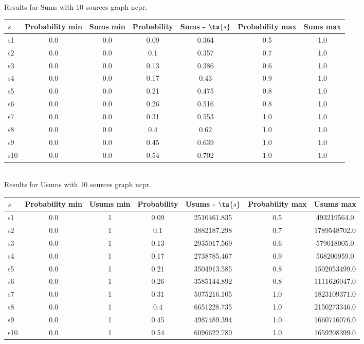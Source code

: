 \documentclass{article}
\begin{document}
\noindent Results for Sums with 10 sources graph ncpr.

\noindent\begin{tabular}{|l|c|c|c|c|c|c|}
\hline
$s$& Probability min & Sums min & Probability & Sums - $\ts{s}$ & Probability max & Sums max\\
\hline
s1 &0.0 & 0.0 & 0.09 & 0.364 & 0.5 & 1.0\\
\hline
s2 &0.0 & 0.0 & 0.1 & 0.357 & 0.7 & 1.0\\
\hline
s3 &0.0 & 0.0 & 0.13 & 0.386 & 0.6 & 1.0\\
\hline
s4 &0.0 & 0.0 & 0.17 & 0.43 & 0.9 & 1.0\\
\hline
s5 &0.0 & 0.0 & 0.21 & 0.475 & 0.8 & 1.0\\
\hline
s6 &0.0 & 0.0 & 0.26 & 0.516 & 0.8 & 1.0\\
\hline
s7 &0.0 & 0.0 & 0.31 & 0.553 & 1.0 & 1.0\\
\hline
s8 &0.0 & 0.0 & 0.4 & 0.62 & 1.0 & 1.0\\
\hline
s9 &0.0 & 0.0 & 0.45 & 0.639 & 1.0 & 1.0\\
\hline
s10 &0.0 & 0.0 & 0.54 & 0.702 & 1.0 & 1.0\\
\hline
\end{tabular}\\

\noindent Results for Usums with 10 sources graph ncpr.

\noindent\begin{tabular}{|l|c|c|c|c|c|c|}
\hline
$s$& Probability min & Usums min & Probability & Usums - $\ts{s}$ & Probability max & Usums max\\
\hline
s1 &0.0 & 1 & 0.09 & 2510461.835 & 0.5 & 493219564.0\\
\hline
s2 &0.0 & 1 & 0.1 & 3882187.298 & 0.7 & 1789548702.0\\
\hline
s3 &0.0 & 1 & 0.13 & 2935017.569 & 0.6 & 579018005.0\\
\hline
s4 &0.0 & 1 & 0.17 & 2738785.467 & 0.9 & 568206959.0\\
\hline
s5 &0.0 & 1 & 0.21 & 3504913.585 & 0.8 & 1502053499.0\\
\hline
s6 &0.0 & 1 & 0.26 & 3585144.892 & 0.8 & 1111626047.0\\
\hline
s7 &0.0 & 1 & 0.31 & 5075216.105 & 1.0 & 1823109371.0\\
\hline
s8 &0.0 & 1 & 0.4 & 6651228.735 & 1.0 & 2150273346.0\\
\hline
s9 &0.0 & 1 & 0.45 & 4987489.394 & 1.0 & 1660716076.0\\
\hline
s10 &0.0 & 1 & 0.54 & 6096622.789 & 1.0 & 1659208399.0\\
\hline
\end{tabular}\\
\end{document}
